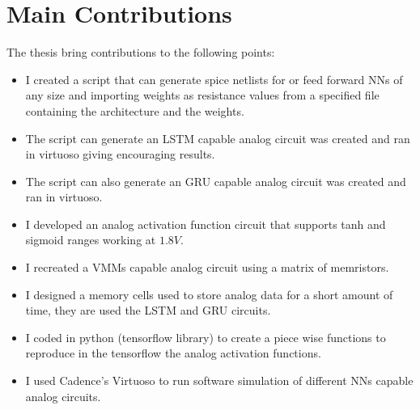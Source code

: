 \section{Main Contributions}
\label{sec:contributions}

The thesis bring contributions to the following points:

\begin{itemize}
  \item I created a script that can generate spice netlists for  or feed forward \aclp{NN} of any size and importing weights as resistance values from a specified file containing the architecture and the weights.
  \item The script can generate an \ac{LSTM} capable analog circuit was created and ran in virtuoso giving encouraging results.
  \item The script can also generate an \ac{GRU} capable analog circuit was created and ran in virtuoso.
  \item I developed an analog activation function circuit that supports \ac{tanh} and sigmoid ranges working at $1.8V$.
  \item I recreated a \acp{VMM} capable analog circuit using a matrix of memristors.
  \item I designed a memory cells used to store analog data for a short amount of time, they are used the \ac{LSTM} and \ac{GRU} circuits.
  \item I coded in python \cite{python} (tensorflow library\cite{tensorflow}) to create a piece wise functions to reproduce in the tensorflow the analog activation functions.
  \item I used Cadence's Virtuoso to run software simulation of different \acp{NN} capable analog circuits.
\end{itemize}

